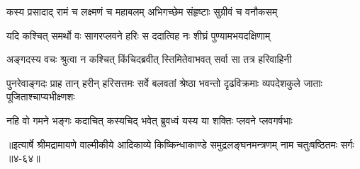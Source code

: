 \twolineshloka
{कस्य प्रसादाद् रामं च लक्ष्मणं च महाबलम्}
{अभिगच्छेम संहृष्टाः सुग्रीवं च वनौकसम्} %

\twolineshloka
{यदि कश्चित् समर्थो वः सागरप्लवने हरिः}
{स ददात्विह नः शीघ्रं पुण्यामभयदक्षिणाम्} %

\twolineshloka
{अङ्गदस्य वचः श्रुत्वा न कश्चित् किंचिदब्रवीत्}
{स्तिमितेवाभवत् सर्वा सा तत्र हरिवाहिनी} %

\threelineshloka
{पुनरेवाङ्गदः प्राह तान् हरीन् हरिसत्तमः}
{सर्वे बलवतां श्रेष्ठा भवन्तो दृढविक्रमाः}
{व्यपदेशकुले जाताः पूजिताश्चाप्यभीक्ष्णशः} %

\twolineshloka
{नहि वो गमने भङ्गः कदाचित् कस्यचिद् भवेत्}
{ब्रुवध्वं यस्य या शक्तिः प्लवने प्लवगर्षभाः} %


॥इत्यार्षे श्रीमद्रामायणे वाल्मीकीये आदिकाव्ये किष्किन्धाकाण्डे समुद्रलङ्घनमन्त्रणम् नाम चतुःषष्ठितमः सर्गः ॥४-६४॥
